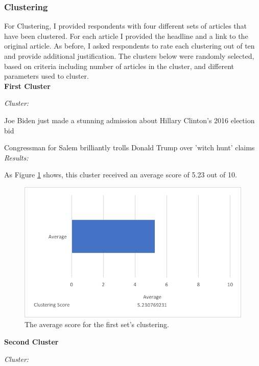 \documentclass[12pt]{article}
\begin{document}
\subsubsection{Clustering}

For Clustering, I provided respondents with four different sets of articles that have been clustered. For each article I provided the headline and a link to the original article. As before, I asked respondents to rate each clustering out of ten and provide additional justification. The clusters below were randomly selected, based on criteria including number of articles in the cluster, and different parameters used to cluster. \\

\textbf{First Cluster}

\emph{Cluster:}

Joe Biden just made a stunning admission about Hillary Clinton's 2016 election bid

Congressman for Salem brilliantly trolls Donald Trump over 'witch hunt' claims \\

\emph{Results:}

As Figure \ref{cluster1} shows, this cluster received an average score of 5.23 out of 10. \\

\begin{figure}[ht!]
  \centering
    \includegraphics[scale=0.7]{cluster1score.png}
   \caption[The average score for a cluster]{The average score for the first set's clustering.}
   \label{cluster1}
\end{figure} 

\textbf{Second Cluster}

\emph{Cluster:}
\end{document}
